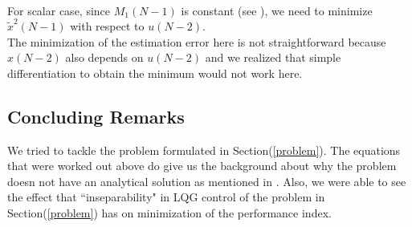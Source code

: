 \documentclass[12pt]{caltech_thesis_progress1}
\begin{document}
\begin{align*}
\end{align*}
For scalar case, since $M_{1}(N-1)$ is constant (see \cite{samir}), we need to minimize $\tilde{x}^{2}(N-1)$ with respect to $u(N-2)$.\\
The minimization of the estimation error here is not straightforward because $x(N-2)$ also depends on $u(N-2)$ and we realized that simple differentiation to obtain the minimum would not work here.\\

\subsection{Concluding Remarks}
We tried to tackle the problem formulated in Section(\ref{problem}). The equations that were worked out above do give us the background about why the problem doesn not have an analytical solution as mentioned in \cite{berstekas}. Also, we were able to see the effect that ``inseparability" in LQG control of the problem in Section(\ref{problem}) has on minimization of the performance index. 
\end{document}
